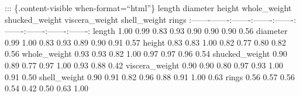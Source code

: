 \documentclass[
  letterpaper,
  DIV=11,
  numbers=noendperiod]{scrartcl}
\begin{document}
::: \{.content-visible when-format=``html''\} \textbar{} length
\textbar{} diameter \textbar{} height \textbar{} whole\_weight
\textbar{} shucked\_weight \textbar{} viscera\_weight \textbar{}
shell\_weight \textbar{} rings \textbar{} \textbar{}
\textbar:-------\textbar-------:\textbar-------:\textbar-------:\textbar-------:\textbar-------:\textbar-------:\textbar-------:\textbar-------:\textbar{}
\textbar{} length \textbar{} 1.00 \textbar{} 0.99 \textbar{} 0.83
\textbar{} 0.93 \textbar{} 0.90 \textbar{} 0.90 \textbar{} 0.90
\textbar{} 0.56 \textbar{} \textbar{} diameter \textbar{} 0.99
\textbar{} 1.00 \textbar{} 0.83 \textbar{} 0.93 \textbar{} 0.89
\textbar{} 0.90 \textbar{} 0.91 \textbar{} 0.57 \textbar{} \textbar{}
height \textbar{} 0.83 \textbar{} 0.83 \textbar{} 1.00 \textbar{} 0.82
\textbar{} 0.77 \textbar{} 0.80 \textbar{} 0.82 \textbar{} 0.56
\textbar{} \textbar{} whole\_weight \textbar{} 0.93 \textbar{} 0.93
\textbar{} 0.82 \textbar{} 1.00 \textbar{} 0.97 \textbar{} 0.97
\textbar{} 0.96 \textbar{} 0.54 \textbar{} \textbar{} shucked\_weight
\textbar{} 0.90 \textbar{} 0.89 \textbar{} 0.77 \textbar{} 0.97
\textbar{} 1.00 \textbar{} 0.93 \textbar{} 0.88 \textbar{} 0.42
\textbar{} \textbar{} viscera\_weight \textbar{} 0.90 \textbar{} 0.90
\textbar{} 0.80 \textbar{} 0.97 \textbar{} 0.93 \textbar{} 1.00
\textbar{} 0.91 \textbar{} 0.50 \textbar{} \textbar{} shell\_weight
\textbar{} 0.90 \textbar{} 0.91 \textbar{} 0.82 \textbar{} 0.96
\textbar{} 0.88 \textbar{} 0.91 \textbar{} 1.00 \textbar{} 0.63
\textbar{} \textbar{} rings \textbar{} 0.56 \textbar{} 0.57 \textbar{}
0.56 \textbar{} 0.54 \textbar{} 0.42 \textbar{} 0.50 \textbar{} 0.63
\textbar{} 1.00 \textbar{}
\end{document}
